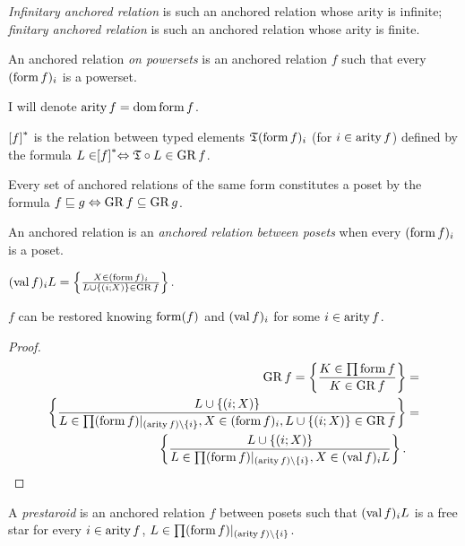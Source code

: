 \begin{defn}
\emph{Infinitary
anchored relation} is such an anchored relation whose arity is infinite;
\emph{finitary anchored relation} is such an anchored relation whose
arity is finite.
\end{defn}

\begin{defn}
An anchored relation \emph{on
powersets} is an anchored relation $f$ such that every $(\operatorname{form} f)_{i}$
is a powerset.
\end{defn}
I will denote $\operatorname{arity} f=\operatorname{dom}\operatorname{form} f$.
\begin{defn}
$\mathrel{\left[f\right]^{\ast}}$ is the relation between typed elements $\mathfrak{T}(\operatorname{form} f)_{i}$
(for $i\in\operatorname{arity} f$) defined by the formula $L\in\mathrel{\left[f\right]^{\ast}}\Leftrightarrow\mathfrak{T}\circ L\in\operatorname{GR} f$.

Every set of anchored relations of the same form constitutes a poset
by the formula $f\sqsubseteq g\Leftrightarrow\operatorname{GR} f\subseteq\operatorname{GR} g$.
\end{defn}

\begin{defn}
An anchored relation is an
\emph{anchored relation between posets} when every $(\operatorname{form} f)_{i}$
is a poset.
\end{defn}

\begin{defn}
$(\operatorname{val} f)_{i}L=\left\{ \frac{X\in(\operatorname{form} f)_{i}}{L\cup\{(i;X)\}\in\operatorname{GR} f}\right\}.$\end{defn}
\begin{prop}
$f$ can be restored knowing $\operatorname{form}(f)$ and $(\operatorname{val} f)_{i}$ for some
$i\in\operatorname{arity} f$.\end{prop}
\begin{proof}
~
\begin{align*}
\operatorname{GR} f=\left\{ \frac{K\in\prod\operatorname{form} f}{K\in\operatorname{GR} f}\right\} & =\\
\left\{ \frac{L\cup\{(i;X)\}}{L\in\prod(\operatorname{form} f)|_{(\operatorname{arity} f)\setminus\{i\}},X\in(\operatorname{form} f)_{i},L\cup\{(i;X)\}\in\operatorname{GR} f}\right\} & =\\
\left\{ \frac{L\cup\{(i;X)\}}{L\in\prod(\operatorname{form} f)|_{(\operatorname{arity} f)\setminus\{i\}},X\in(\operatorname{val} f)_{i}L}\right\}.
\end{align*}
\end{proof}
\begin{defn}
A \emph{prestaroid} is an anchored relation $f$
between posets such that $(\operatorname{val} f)_{i}L$ is a free star for every
$i\in\operatorname{arity} f$, $L\in\prod(\operatorname{form} f)|_{(\operatorname{arity} f)\setminus\{i\}}$.
\end{defn}

